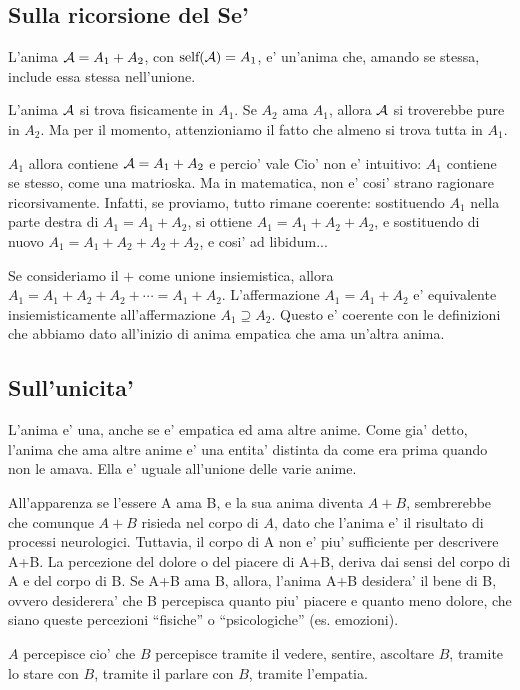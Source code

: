 \subsection{Sulla ricorsione del Se'}
\label{ricorsioneSe}

L'anima $\mathcal{A}=A_1+A_2$, con $\textrm{self}(\mathcal{A})=A_1$, e' un'anima che, amando se stessa, include essa stessa nell'unione. 

L'anima $\mathcal{A}$ si trova fisicamente in $A_1$. Se $A_2$ ama $A_1$, allora $\mathcal{A}$ si troverebbe pure in $A_2$. Ma per il momento, attenzioniamo il fatto che almeno si trova tutta in $A_1$.

$A_1$ allora contiene $\mathcal{A}=A_1+A_2$ e percio' vale 
Cio' non e' intuitivo: $A_1$ contiene se stesso, come una matrioska. Ma in matematica, non e' cosi' strano ragionare ricorsivamente. Infatti, se proviamo, tutto rimane coerente: sostituendo $A_1$ nella parte destra di $A_1=A_1+A_2$, si ottiene $A_1=A_1+A_2+A_2$, e sostituendo di nuovo $A_1=A_1+A_2+A_2+A_2$, e cosi' ad libidum...

Se consideriamo il $+$ come unione insiemistica, allora $A_1=A_1+A_2+A_2+\cdots = A_1+A_2$. L'affermazione $A_1=A_1+A_2$ e' equivalente insiemisticamente all'affermazione $A_1 \supseteq A_2$. Questo e' coerente con le definizioni che abbiamo dato all'inizio di anima empatica che ama un'altra anima.

\subsection{Sull'unicita'}

L'anima e' una, anche se e' empatica ed ama altre anime. Come gia' detto, l'anima che ama altre anime e' una entita' distinta da come era prima quando non le amava. Ella e' uguale all'unione delle varie anime. 

All'apparenza se l'essere A ama B, e la sua anima diventa $A+B$, sembrerebbe che comunque $A+B$ risieda nel corpo di $A$, dato che l'anima e' il risultato di processi neurologici. Tuttavia, il corpo di A non e' piu' sufficiente per descrivere A+B. La percezione del dolore o del piacere di A+B, deriva dai sensi del corpo di A e del corpo di B. Se A+B ama B, allora, l'anima A+B desidera' il bene di B, ovvero desiderera' che B percepisca quanto piu' piacere e quanto meno dolore, che siano queste percezioni ``fisiche'' o ``psicologiche'' (es. emozioni). 

$A$ percepisce cio' che  $B$ percepisce tramite il vedere, sentire, ascoltare $B$, tramite lo stare con $B$, tramite il parlare con $B$, tramite l'empatia.

